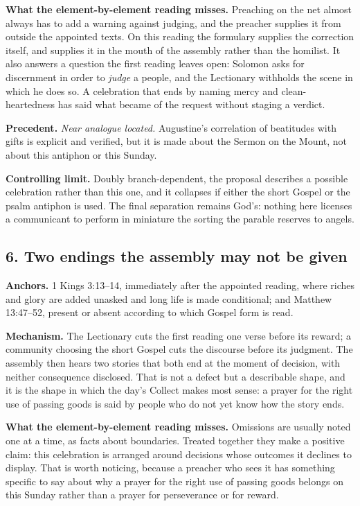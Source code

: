 \textbf{What the element-by-element reading misses.} Preaching on the net almost always has to add a warning against judging, and the preacher supplies it from outside the appointed texts. On this reading the formulary supplies the correction itself, and supplies it in the mouth of the assembly rather than the homilist. It also answers a question the first reading leaves open: Solomon asks for discernment in order to \emph{judge} a people, and the Lectionary withholds the scene in which he does so. A celebration that ends by naming mercy and clean-heartedness has said what became of the request without staging a verdict.

\textbf{Precedent.} \emph{Near analogue located.} Augustine's correlation of beatitudes with gifts is explicit and verified, but it is made about the Sermon on the Mount, not about this antiphon or this Sunday.

\textbf{Controlling limit.} Doubly branch-dependent, the proposal describes a possible celebration rather than this one, and it collapses if either the short Gospel or the psalm antiphon is used. The final separation remains God's: nothing here licenses a communicant to perform in miniature the sorting the parable reserves to angels.

\subsection*{6. Two endings the assembly may not be given}

\textbf{Anchors.} 1 Kings 3:13--14, immediately after the appointed reading, where riches and glory are added unasked and long life is made conditional; and Matthew 13:47--52, present or absent according to which Gospel form is read.

\textbf{Mechanism.} The Lectionary cuts the first reading one verse before its reward; a community choosing the short Gospel cuts the discourse before its judgment. The assembly then hears two stories that both end at the moment of decision, with neither consequence disclosed. That is not a defect but a describable shape, and it is the shape in which the day's Collect makes most sense: a prayer for the right use of passing goods is said by people who do not yet know how the story ends.

\textbf{What the element-by-element reading misses.} Omissions are usually noted one at a time, as facts about boundaries. Treated together they make a positive claim: this celebration is arranged around decisions whose outcomes it declines to display. That is worth noticing, because a preacher who sees it has something specific to say about why a prayer for the right use of passing goods belongs on this Sunday rather than a prayer for perseverance or for reward.


